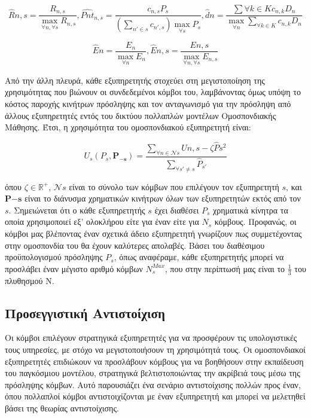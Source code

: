 \[\hat{R}{n,s} = \frac{R_{n,s}}{\max \limits_{\forall n, \forall s} { R_{n,s} }}, \hat{Pnt}_{n,s} = \frac{c_{n,s}P_s}{(\sum \limits_{n'\in s} c_{n',s}) \max \limits_{\forall s} P_s}, \hat{d}{n} = \frac{\sum \limits{\forall k \in K} c_{n,k} D_n}{\max \limits_{\forall n} { \sum \limits_{\forall k \in K} c_{n,k} D_n }}\]

\[\hat{E}{n} = \frac{E_{n}}{\max \limits_{\forall n} { E_{n} }},  \hat{E}{n,s} = \frac{E{n,s}}{\max \limits_{\forall n, \forall s} { E_{n,s} }}\]

Από την άλλη πλευρά, κάθε εξυπηρετητής στοχεύει στη μεγιστοποίηση της χρησιμότητας που βιώνουν οι συνδεδεμένοι κόμβοι του, λαμβάνοντας όμως υπόψη το κόστος παροχής κινήτρων πρόσληψης και τον ανταγωνισμό για την πρόσληψη από άλλους εξυπηρετητές εντός του δικτύου πολλαπλών μοντέλων Ομοσπονδιακής Μάθησης. Έτσι, η χρησιμότητα του ομοσπονδιακού εξυπηρετητή είναι:

\vspace{-5pt}

\begin{equation}
U_s(P_s, \mathbf{P_{-s}}) = \frac{\sum\limits_{\forall n\in \mathcal{N}s} U{n,s} - \zeta \hat{P}s^2}{\sum\limits_{\forall s'\neq s} \hat{P}_{s'}}
\label{eq8}
\end{equation}

\vspace{-5pt}

\noindent
όπου $\zeta \in \mathbb{R}^+$, $\mathcal{N}s$ είναι το σύνολο των κόμβων που επιλέγουν τον εξυπηρετητή $s$, και $\mathbf{P{-s}}$ είναι το διάνυσμα χρηματικών κινήτρων όλων των εξυπηρετητών εκτός από τον $s$. Σημειώνεται ότι ο κάθε εξυπηρετητής $s$ έχει διαθέσει $P_s$ χρηματικά κίνητρα τα οποία χρησιμοποιεί εξ' ολοκλήρου είτε για έναν είτε για $N_s$ κόμβους. Προφανώς, οι κόμβοι μας βλέποντας έναν σχετικά άδειο εξυπηρετητή γνωρίζουν πως συμμετέχοντας στην ομοσπονδία του θα έχουν καλύτερες απολαβές. Βάσει του διαθέσιμου προϋπολογισμού πρόσληψης $P_s$, όπως αναφέραμε, κάθε εξυπηρετητής μπορεί να προσλάβει έναν μέγιστο αριθμό κόμβων $N_s^{Max}$, που στην περίπτωσή μας είναι το $\frac{1}{3}$ του πλυθησμού N.

\subsection{Προσεγγιστική Αντιστοίχιση}

Οι κόμβοι επιλέγουν στρατηγικά εξυπηρετητές για να προσφέρουν τις υπολογιστικές τους υπηρεσίες, με στόχο να μεγιστοποιήσουν τη χρησιμότητά τους. Οι ομοσπονδιακοί εξυπηρετητές επιδιώκουν να προσλάβουν κόμβους για να βοηθήσουν στην εκπαίδευση του παγκόσμιου μοντέλου, στρατηγικά βελτιστοποιώντας την ακρίβειά τους μέσω της πρόσληψης κόμβων. Αυτό παρουσιάζει ένα σενάριο αντιστοίχισης πολλών προς έναν, όπου πολλαπλοί κόμβοι αντιστοιχίζονται με έναν εξυπηρετητή και μπορεί να μελετηθεί βάσει της θεωρίας αντιστοίχισης.

